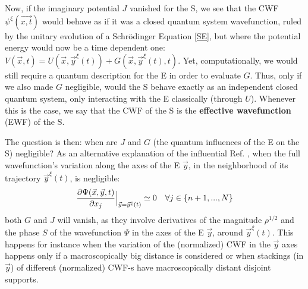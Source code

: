 \documentclass[11pt, a4paper]{article} %
\begin{document}


Now, if the imaginary potential $J$ vanished for the S, we see that the CWF $\psi^\xi(\vec{x,t})$ would behave as if it was a closed quantum system wavefunction, ruled by the unitary evolution of a Schrödinger Equation \eqref{SE}, but where the potential energy would now be a time dependent one: $V(\vec{x},t)=U(\vec{x},\vec{y}^\xi(t))+G(\vec{x},\vec{y}^\xi(t),t)$. Yet, computationally, we would still require a quantum description for the E in order to evaluate $G$. Thus, only if we also made $G$ negligible, would the S behave exactly as an independent closed quantum system, only interacting with the E classically (through $U$). Whenever this is the case, we say that the CWF of the S is the {\bf effective wavefunction} (EWF) of the S. 

The question is then: when are $J$ and $G$ (the quantum influences of the E on the S) negligible? As an alternative explanation of the influential Ref. \cite{Absolute}, when the full wavefunction's variation along the axes of the E $\vec{y}$, in the neighborhood of its trajectory $\vec{y}^\xi(t)$, is negligible: 
\begin{equation}
\pdv{\Psi(\vec{x},\vec{y},t)}{x_j}\Big\rvert_{\vec{y}=\vec{y}^\xi(t)}\simeq 0  \quad \forall j\in\{n+1,...,N\}
\end{equation}
both $G$ and $J$ will vanish, as they involve derivatives of the magnitude $\rho^{1/2}$ and the phase $S$ of the wavefunction $\Psi$ in the axes of the E $\vec{y}$, around $\vec{y}^\xi(t)$. This happens for instance when the variation of the (normalized) CWF in the $\vec{y}
$ axes happens only if a macroscopically big distance is considered or when stackings (in $\vec{y}$) of different (normalized) CWF-s have macroscopically distant disjoint supports.
\end{document}
